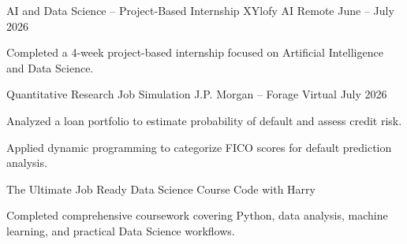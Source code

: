 
\begin{cventries}

  \cventry
    {AI and Data Science -- Project-Based Internship}
    {XYlofy AI}
    {Remote}
    {June -- July 2026}
    {
      \begin{cvitems}
        \item {Completed a 4-week project-based internship focused on Artificial Intelligence and Data Science.}
      \end{cvitems}
    }

  \vspace{1.5mm}

  \cventry
    {Quantitative Research Job Simulation}
    {J.P. Morgan -- Forage}
    {Virtual}
    {July 2026}
    {
      \begin{cvitems}
        \item {Analyzed a loan portfolio to estimate probability of default and assess credit risk.}
        \item {Applied dynamic programming to categorize FICO scores for default prediction analysis.}
      \end{cvitems}
    }

  \vspace{1.5mm}

  \cventry
    {The Ultimate Job Ready Data Science Course}
    {Code with Harry}
    {}
    {}
    {
      \begin{cvitems}
        \item {Completed comprehensive coursework covering Python, data analysis, machine learning, and practical Data Science workflows.}
      \end{cvitems}
    }

\end{cventries}
